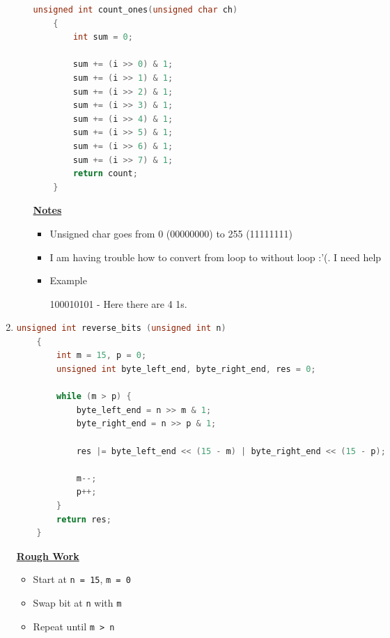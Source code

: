 \documentclass[12pt]{article}
\begin{document}
\begin{enumerate}[1.]
\begin{enumerate}[a)]
\begin{lstlisting}[language=c]
    unsigned int count_ones(unsigned char ch)
    {
        int sum = 0;

        sum += (i >> 0) & 1;
        sum += (i >> 1) & 1;
        sum += (i >> 2) & 1;
        sum += (i >> 3) & 1;
        sum += (i >> 4) & 1;
        sum += (i >> 5) & 1;
        sum += (i >> 6) & 1;
        sum += (i >> 7) & 1;
        return count;
    }
\end{lstlisting}

        \bigskip

        \underline{\textbf{Notes}}

        \begin{itemize}
            \item Unsigned char goes from 0 (00000000) to 255 (11111111)
            \item I am having trouble how to convert from loop to without loop :'(.
            I need help
            \item Example

            \bigskip

            100010101 - Here there are 4 1s.

            \bigskip
        \end{itemize}

    \end{enumerate}

    \item

\begin{lstlisting}[language=c]
    unsigned int reverse_bits (unsigned int n)
    {
        int m = 15, p = 0;
        unsigned int byte_left_end, byte_right_end, res = 0;

        while (m > p) {
            byte_left_end = n >> m & 1;
            byte_right_end = n >> p & 1;

            res |= byte_left_end << (15 - m) | byte_right_end << (15 - p);

            m--;
            p++;
        }
        return res;
    }
\end{lstlisting}

    \bigskip

    \underline{\textbf{Rough Work}}

    \begin{itemize}
        \item Start at \texttt{n = 15}, \texttt{m = 0}
        \item Swap bit at \texttt{n} with \texttt{m}
        \item Repeat until \texttt{m > n}
    \end{itemize}


\end{enumerate}
\end{document}
